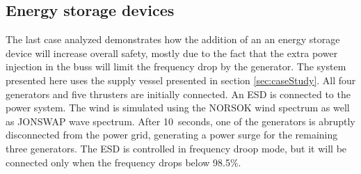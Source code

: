 \documentclass[journal]{IEEEtran}
\begin{document}
%
%

\subsection{Energy storage devices}
\label{sec:esd}
The last case analyzed demonstrates how the addition of an an energy storage device will increase overall safety, mostly due to the fact that the extra power injection in the buss will limit the frequency drop by the generator. The system presented here uses the supply vessel presented in section \ref{sec:caseStudy}. All four generators and five thrusters are initially connected. An \ac{ESD} is connected to the power system. The wind is simulated using the NORSOK wind spectrum as well as JONSWAP wave spectrum. After 10~seconds, one of the generators is abruptly disconnected  from the power grid, generating a power surge for the remaining three generators. The \ac{ESD} is controlled in frequency droop mode, but it will be connected only when the frequency drops below 98.5\%.
\end{document}
